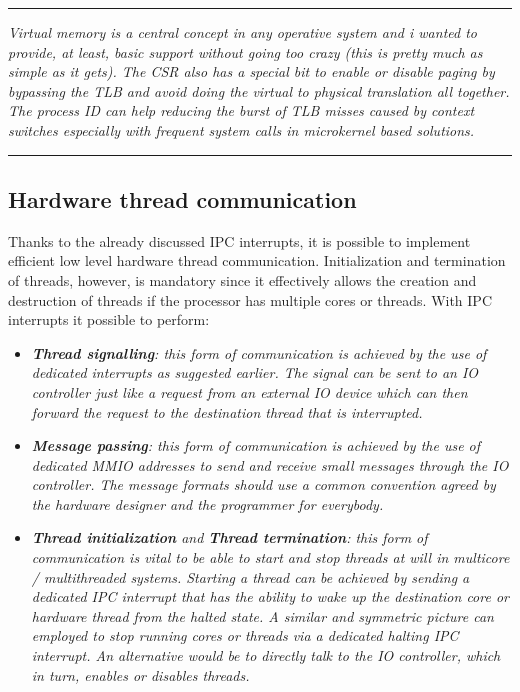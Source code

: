 \documentclass{article}
\begin{document}
        \par\noindent\rule{\textwidth}{0.4pt}
        \textit{Virtual memory is a central concept in any operative system and i wanted to provide, at least, basic support without going too crazy (this is pretty much as simple as it gets). The CSR also has a special bit to enable or disable paging by bypassing the TLB and avoid doing the virtual to physical translation all together. The process ID can help reducing the burst of TLB misses caused by context switches especially with frequent system calls in microkernel based solutions.}
        \par\noindent\rule{\textwidth}{0.4pt}

        \subsection{Hardware thread communication}

            Thanks to the already discussed IPC interrupts, it is possible to implement efficient low level hardware thread communication. Initialization and termination of threads, however, is mandatory since it effectively allows the creation and destruction of threads if the processor has multiple cores or threads. With IPC interrupts it possible to perform:

            \begin{itemize}

                \item \textit{\textbf{Thread signalling}: this form of communication is achieved by the use of dedicated interrupts as suggested earlier. The signal can be sent to an IO controller just like a request from an external IO device which can then forward the request to the destination thread that is interrupted.}

                \item \textit{\textbf{Message passing}: this form of communication is achieved by the use of dedicated MMIO addresses to send and receive small messages through the IO controller. The message formats should use a common convention agreed by the hardware designer and the programmer for everybody.}

                \item \textit{\textbf{Thread initialization} and \textbf{Thread termination}: this form of communication is vital to be able to start and stop threads at will in multicore / multithreaded systems. Starting a thread can be achieved by sending a dedicated IPC interrupt that has the ability to wake up the destination core or hardware thread from the halted state. A similar and symmetric picture can employed to stop running cores or threads via a dedicated halting IPC interrupt. An alternative would be to directly talk to the IO controller, which in turn, enables or disables threads.}

            \end{itemize}
\end{document}
